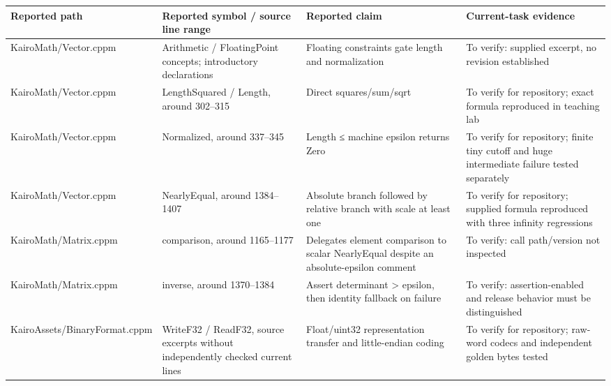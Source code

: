 {\def\LTcaptype{none} %
\begin{longtable}[]{@{}
  >{\raggedright\arraybackslash}p{}
  >{\raggedright\arraybackslash}p{}
  >{\raggedright\arraybackslash}p{}
  >{\raggedright\arraybackslash}p{}@{}}
\toprule\noalign{}
\begin{minipage}[b]{\linewidth}\raggedright
Reported path
\end{minipage} & \begin{minipage}[b]{\linewidth}\raggedright
Reported symbol / source line range
\end{minipage} & \begin{minipage}[b]{\linewidth}\raggedright
Reported claim
\end{minipage} & \begin{minipage}[b]{\linewidth}\raggedright
Current-task evidence
\end{minipage} \\
\midrule\noalign{}
\endhead
\bottomrule\noalign{}
\endlastfoot
KairoMath/Vector.cppm & Arithmetic / FloatingPoint concepts; introductory declarations & Floating constraints gate length and normalization & To verify: supplied excerpt, no revision established \\
KairoMath/Vector.cppm & LengthSquared / Length, around 302--315 & Direct squares/sum/sqrt & To verify for repository; exact formula reproduced in teaching lab \\
KairoMath/Vector.cppm & Normalized, around 337--345 & Length ≤ machine epsilon returns Zero & To verify for repository; finite tiny cutoff and huge intermediate failure tested separately \\
KairoMath/Vector.cppm & NearlyEqual, around 1384--1407 & Absolute branch followed by relative branch with scale at least one & To verify for repository; supplied formula reproduced with three infinity regressions \\
KairoMath/Matrix.cppm & comparison, around 1165--1177 & Delegates element comparison to scalar NearlyEqual despite an absolute-epsilon comment & To verify: call path/version not inspected \\
KairoMath/Matrix.cppm & inverse, around 1370--1384 & Assert determinant \textgreater{} epsilon, then identity fallback on failure & To verify: assertion-enabled and release behavior must be distinguished \\
KairoAssets/BinaryFormat.cppm & WriteF32 / ReadF32, source excerpts without independently checked current lines & Float/uint32 representation transfer and little-endian coding & To verify for repository; raw-word codecs and independent golden bytes tested \\
\end{longtable}
}

